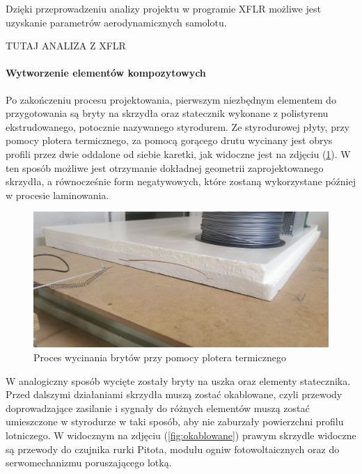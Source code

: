 \documentclass[12pt, a4paper]{article}
\let\oldref\ref
\renewcommand{\ref}[1]{(\oldref{#1})}
\begin{document}
Dzięki przeprowadzeniu analizy projektu w programie XFLR możliwe jest uzyskanie parametrów aerodynamicznych samolotu.

TUTAJ ANALIZA Z XFLR

\FloatBarrier
\paragraph{Wytworzenie elementów kompozytowych}\mbox{}

Po zakończeniu procesu projektowania, pierwszym niezbędnym elementem do przygotowania są bryty na skrzydła oraz statecznik wykonane z polistyrenu ekstrudowanego, potocznie nazywanego styrodurem. Ze styrodurowej płyty, przy pomocy plotera termicznego, za pomocą gorącego drutu wycinany jest obrys profili przez dwie oddalone od siebie karetki, jak widoczne jest na zdjęciu \ref{fig:ploter}. W ten sposób możliwe jest otrzymanie dokładnej geometrii zaprojektowanego skrzydła, a równocześnie form negatywowych, które zostaną wykorzystane później w procesie laminowania.

\begin{figure}[ht]
    \centering
    \includegraphics[width=1\textwidth]{budowa5}
    \caption{Proces wycinania brytów przy pomocy plotera termicznego}
    \label{fig:ploter}
\end{figure}
 
W analogiczny sposób wycięte zostały bryty na uszka oraz elementy statecznika. Przed dalszymi działaniami skrzydła muszą zostać okablowane, czyli przewody doprowadzające zasilanie i sygnały do różnych elementów muszą zostać umieszczone w styrodurze w taki sposób, aby nie zaburzały powierzchni profilu lotniczego. W widocznym na zdjęciu \ref{fig:okablowane} prawym skrzydle widoczne są przewody do czujnika rurki Pitota, modułu ogniw fotowoltaicznych oraz do serwomechanizmu poruszającego lotką.
\end{document}
